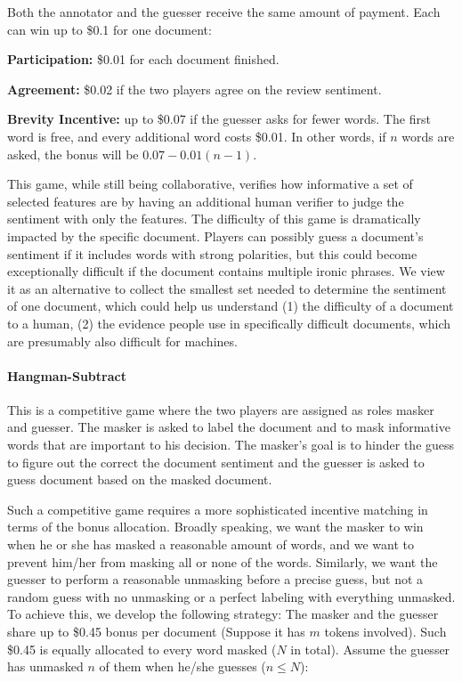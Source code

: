 \documentclass[chi_draft]{sigchi}
\begin{document}
Both the annotator and the guesser receive the same amount of payment.
Each can win up to \$0.1 for one document:\begin{compactitem}
	\item \textbf{Participation: } \$0.01 for each document finished.
	\item \textbf{Agreement: } \$0.02 if the two players agree on the review sentiment.
	\item \textbf{Brevity Incentive: } up to \$0.07 if the guesser asks for fewer words. The first word is free, and every additional word costs \$0.01. In other words, if $n$ words are asked, the bonus will be $0.07-0.01(n-1)$.
\end{compactitem}

This game, while still being collaborative, verifies how informative a set of selected features are by having an additional human verifier to judge the sentiment with only the features. 
The difficulty of this game is dramatically impacted by the specific document. 
Players can possibly guess a document's sentiment if it includes words with strong polarities, but this could become exceptionally difficult if the document contains multiple ironic phrases. 
We view it as an alternative to collect the smallest set needed to determine the sentiment of one document, which could help us understand (1) the difficulty of a document to a human, (2) the evidence people use in specifically difficult documents, which are presumably also difficult for machines.


\paragraph{Hangman-Subtract} 
This is a competitive game where the two players are assigned as roles masker and guesser. The masker is asked to label the document and to mask informative words that are important to his decision. The masker's goal is to hinder the guess to figure out the correct the document sentiment and the guesser is asked to guess document based on the masked document. 

Such a competitive game requires a more sophisticated incentive matching in terms of the bonus allocation. Broadly speaking, we want the masker to win when he or she has masked a reasonable amount of words, and we want to prevent him/her from masking all or none of the words. 
Similarly, we want the guesser to perform a reasonable unmasking before a precise guess, but not a random guess with no unmasking or a perfect labeling with everything unmasked.
To achieve this, we develop the following strategy: 
The masker and the guesser share up to \$0.45 bonus per document (Suppose it has $m$ tokens involved).
Such \$0.45 is equally allocated to every word masked ($N$ in total).
Assume the guesser has unmasked $n$ of them when he/she guesses ($n \leq N$):
\end{document}
